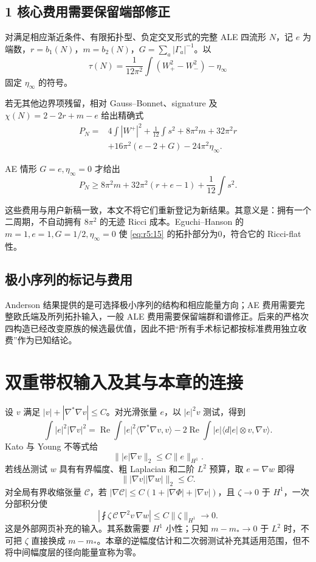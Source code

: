 \documentclass[UTF8,11pt,fontset=none]{ctexart}
\begin{document}
\subsection{1 核心费用需要保留端部修正}\label{ch5:ux6838ux5fc3ux8d39ux7528ux9700ux8981ux4fddux7559ux7aefux90e8ux4feeux6b63}

对满足相应渐近条件、有限拓扑型、负定交叉形式的完整 ALE 四流形 \(N\)，记 \(e\) 为端数，\(r=b_1(N)\)，\(m=b_2(N)\)，\(G=\sum_a|\Gamma_a|^{-1}\)。以 \[
 \tau(N)=\frac1{12\pi^2}\int(W_+^2-W_-^2)-\eta_\infty
\] 固定 \(\eta_\infty\) 的符号。

若无其他边界项残留，相对 Gauss--Bonnet、signature 及 \(\chi(N)=2-2r+m-e\) 给出精确式 \[
 \begin{aligned}
 P_N={}&4\int|W^+|^2+\frac1{12}\int s^2
 +8\pi^2m+32\pi^2r\\
 &+16\pi^2(e-2+G)-24\pi^2\eta_\infty.
 \end{aligned}
\tag{5.15}\label{eq:r5:15}
\]

AE 情形 \(G=e,\eta_\infty=0\) 才给出 \[
 P_N\ge8\pi^2m+32\pi^2(r+e-1)+\frac1{12}\int s^2.
\tag{5.16}\label{eq:r5:16}
\]

这些费用与用户新稿一致，本文不将它们重新登记为新结果。其意义是：拥有一个二周期，不自动拥有 \(8\pi^2\) 的无迹 Ricci 成本。Eguchi--Hanson 的 \(m=1,e=1,G=1/2,\eta_\infty=0\) 使 \eqref{eq:r5:15} 的拓扑部分为0，符合它的 Ricci-flat 性。

\subsection{极小序列的标记与费用}\label{ch5:ux6781ux5c0fux5e8fux5217ux7684ux6807ux8bb0ux4e0eux8d39ux7528}

Anderson 结果提供的是可选择极小序列的结构和相应能量方向；AE 费用需要完整欧氏端及所列拓扑输入，一般 ALE 费用需要保留端群和谱修正。后来的严格次四构造已经改变原族的候选最优值，因此不把``所有手术标记都按标准费用独立收费''作为已知结论。\cite{System}

\section{双重带权输入及其与本章的连接}\label{ch5:ux53ccux91cdux5e26ux6743ux8f93ux5165ux53caux5176ux4e0eux672cux7ae0ux7684ux8fdeux63a5}

设 \(v\) 满足 \(|v|+|\nabla^*\nabla v|\le C\)。对光滑张量 \(e\)，以 \(|e|^2v\) 测试，得到 \[
\int|e|^2|\nabla v|^2
=\operatorname{Re}\int|e|^2\langle\nabla^*\nabla v,v\rangle
-2\operatorname{Re}\int |e|\langle d|e|\otimes v,\nabla v\rangle.
\] Kato 与 Young 不等式给 \[
\||e|\nabla v\|_2\le C\|e\|_{H^1}.
\] 若线丛测试 \(w\) 具有有界幅度、粗 Laplacian 和二阶 \(L^2\) 预算，取 \(e=\nabla w\) 即得 \[
\||\nabla v||\nabla w|\|_2\le C.
\] 对全局有界收缩张量 \(\mathcal C\)，若 \(|\nabla\mathcal C|\le C(1+|\nabla\Phi|+|\nabla v|)\)，且 \(\zeta\to0\) 于 \(H^1\)，一次分部积分使 \[
\left|\fint\zeta\,\mathcal C\,\nabla^2v\,\nabla w\right|
\le C\|\zeta\|_{H^1}\to0.
\] 这是外部网页补充的输入。其系数需要 \(H^1\) 小性；只知 \(m-m_*\to0\) 于 \(L^2\) 时，不可把 \(\zeta\) 直接换成 \(m-m_*\)。本章的逆幅度估计和二次弱测试补充其适用范围，但不将中间幅度层的径向能量宣称为零。\cite{Weighted}
\end{document}
